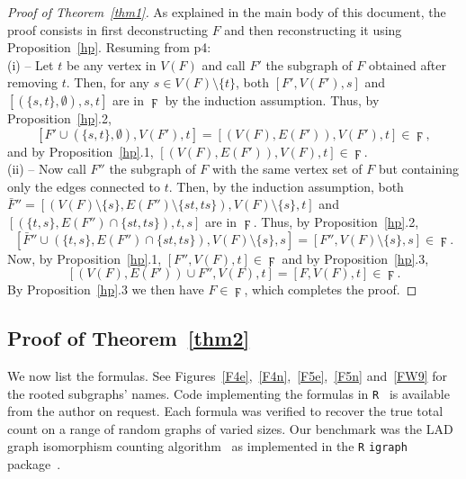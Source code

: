 \documentclass{article}
\theoremstyle{plain}
\begin{document}
\begin{proof}[Proof of Theorem~\protect\ref{thm1}]%
As explained in the main body of this document, the proof consists in first deconstructing $F$ and then reconstructing it using Proposition~\ref{hp}. Resuming from p4:\\

\noindent (i) -- Let $t$ be any vertex in $V(F)$ and call $F'$ the subgraph of $F$ obtained after removing $t$. Then, for any $s\in V(F)\setminus\{t\}$, both $[F',V(F'),s]$ and $[(\{s,t\},\emptyset),s,t]$ are in $\digamma$ by the induction assumption. Thus, by Proposition~\ref{hp}.2,
\[
[F'\cup (\{s,t\},\emptyset),V(F'),t]=[(V(F),E(F')),V(F'),t]\in\digamma,
\]
and by Proposition~\ref{hp}.1, $[(V(F),E(F')),V(F),t]\in\digamma$.\\

\noindent (ii) -- Now call $F''$ the subgraph of $F$ with the same vertex set of $F$ but containing only the edges connected to $t$. Then, by the induction assumption, both $\bar F'' = [(V(F)\setminus\{s\},E(F'')\setminus\{st,ts\}),V(F)\setminus\{s\},t]$ and $[(\{t,s\},E(F'')\cap \{st,ts\}),t,s]$ are in $\digamma$. Thus, by Proposition~\ref{hp}.2, 
\[
[\bar F''\cup(\{t,s\},E(F'')\cap \{st,ts\}),V(F)\setminus\{s\},s]=[F'',V(F)\setminus\{s\},s]\in\digamma.
\]
Now, by Proposition~\ref{hp}.1, $[F'',V(F),t]\in\digamma$ and by Proposition~\ref{hp}.3,
\[
[(V(F),E(F'))\cup F'',V(F),t]=[F,V(F),t]\in\digamma.
\]
By Proposition~\ref{hp}.3 we then have $F\in\digamma$, which completes the proof.
\end{proof}

\subsection{Proof of Theorem~\protect\ref{thm2}}
We now list the formulas. See Figures~\ref{F4e},~\ref{F4n},~\ref{F5e},~\ref{F5n} and~\ref{FW9} for the rooted subgraphs' names. Code implementing the formulas in {\tt R}~\cite{Rsoftware} is available from the author on request. Each formula was verified to recover the true total count on a range of random graphs of varied sizes. Our benchmark was the LAD graph isomorphism counting algorithm~\cite{solnon2010all} as implemented in the {\tt R} {\tt igraph} package~\cite{igraph}.
\end{document}
